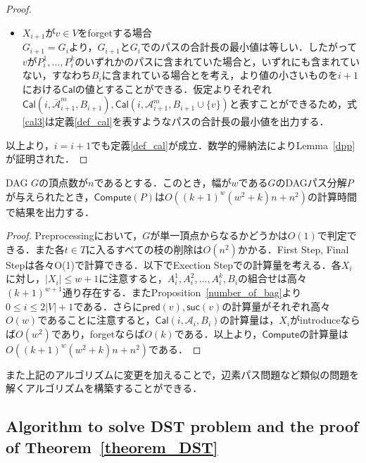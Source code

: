 \begin{proof}
\begin{itemize}
        \item $X_{i+1}$が$v \in V$をforgetする場合 \\
        $G_{i+1} = G_i$より，$G_{i+1}$と$G_i$でのパスの合計長の最小値は等しい．したがって$v$が$P^1_i, \dots , P^k_i$のいずれかのパスに含まれていた場合と，いずれにも含まれていない，すなわち$B_i$に含まれている場合とを考え，より値の小さいものを$i+1$における$\mathsf{Cal}$の値とすることができる．仮定よりそれぞれ$\mathsf{Cal}(i, \mathscr{\overline{A}}^m_{i+1}, B_{i+1}),\mathsf{Cal}(i, \mathscr{A}^m_{i+1}, B_{i+1} \cup \{v\})$と表すことができるため，式\ref{cal3}は定義\ref{def_cal}を表すようなパスの合計長の最小値を出力する．
    \end{itemize}
    以上より，$i = i+1$でも定義\ref{def_cal}が成立．数学的帰納法によりLemma~\ref{dpp}が証明された．
\end{proof}



\begin{lemma}
    DAG $G$の頂点数が$n$であるとする．このとき，幅が$w$である$G$のDAGパス分解$P$が与えられたとき，$\mathsf{Compute}(P)$は$O((k+1)^w(w^2+k)n+n^2)$の計算時間で結果を出力する．
\end{lemma}

\begin{proof}
    Preprocessingにおいて，$G$が単一頂点からなるかどうかは$O(1)$で判定できる．また各$t \in T$に入るすべての枝の削除は$O(n^2)$かかる．First Step, Final Stepは各々O(1)で計算できる．以下でExection Stepでの計算量を考える．各$X_i$に対し，$|X_i| \leq w+1$に注意すると，$A^1_i, A^2_i, \dots, A^k_i, B_i$の組合せは高々$(k+1)^{w+1}$通り存在する．またProposition~\ref{number_of_bag}より$0 \leq i \leq 2|V|+1$である．さらに$\mathsf{pred}(v), \mathsf{suc}(v)$の計算量がそれぞれ高々$O(w)$であることに注意すると，$\mathsf{Cal}(i, \mathscr{A}_i, B_i)$の計算量は，$X_i$がintroduceならば$O(w^2)$であり，forgetならば$O(k)$である．以上より，$\mathsf{Compute}$の計算量は$O((k+1)^w(w^2+k)n+n^2)$である．
\end{proof}

また上記のアルゴリズムに変更を加えることで，辺素パス問題など類似の問題を解くアルゴリズムを構築することができる．














\subsection{Algorithm to solve DST problem and the proof of Theorem~\ref{theorem_DST}}


